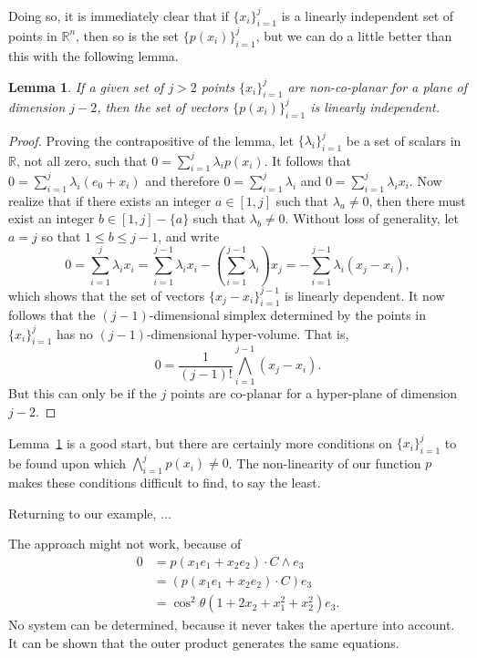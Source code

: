 \documentclass{birkjour}
\newtheorem{lem}[thm]{Lemma}
\theoremstyle{definition}
\theoremstyle{remark}
\numberwithin{equation}{section}
\newcommand{\R}{\mathbb{R}}
\begin{document}
Doing so, it is immediately clear that if $\{x_i\}_{i=1}^j$ is a linearly independent
set of points in $\R^n$, then so is the set $\{p(x_i)\}_{i=1}^j$, but we can do
a little better than this with the following lemma.
\begin{lem}\label{lma_non_co_planar}
If a given set of $j>2$ points $\{x_i\}_{i=1}^j$ are non-co-planar for a plane of
dimension $j-2$, then the set of vectors $\{p(x_i)\}_{i=1}^j$ is linearly independent.
\end{lem}
\begin{proof}
Proving the contrapositive of the lemma, let $\{\lambda_i\}_{i=1}^j$ be
a set of scalars in $\R$, not all zero, such that $0=\sum_{i=1}^j\lambda_i p(x_i)$.
It follows that $0=\sum_{i=1}^j\lambda_i(e_0+x_i)$ and therefore
$0=\sum_{i=1}^j\lambda_i$ and $0=\sum_{i=1}^j\lambda_i x_i$.
Now realize that if there exists an integer $a\in[1,j]$ such that $\lambda_a\neq 0$,
then there must exist an integer $b\in[1,j]-\{a\}$ such that $\lambda_b\neq 0$.
Without loss of generality, let $a=j$ so that $1\leq b\leq j-1$, and write
\begin{equation*}
0 = \sum_{i=1}^j\lambda_ix_i = \sum_{i=1}^{j-1}\lambda_ix_i - \left(\sum_{i=1}^{j-1}\lambda_i\right)x_j = -\sum_{i=1}^{j-1}\lambda_i(x_j-x_i),
\end{equation*}
which shows that the set of vectors $\{x_j-x_i\}_{i=1}^{j-1}$ is linearly dependent.
It now follows that the $(j-1)$-dimensional simplex determined by the points in $\{x_i\}_{i=1}^j$
has no $(j-1)$-dimensional hyper-volume.  That is,
\begin{equation*}
0 = \frac{1}{(j-1)!}\bigwedge_{i=1}^{j-1}(x_j-x_i).
\end{equation*}
But this can only be if the $j$ points are co-planar for a hyper-plane of dimension $j-2$.
\end{proof}

Lemma~\ref{lma_non_co_planar} is a good start, but there are certainly more conditions on $\{x_i\}_{i=1}^j$ to be found upon which
$\bigwedge_{i=1}^j p(x_i)\neq 0$.  The non-linearity of our function $p$ makes these conditions difficult to find, to say the least.

Returning to our example, ...


The approach might not work, because of
\begin{align*}
0 &= p(x_1e_1+x_2e_2)\cdot C\wedge e_3 \\
 &= (p(x_1e_1+x_2e_2)\cdot C)e_3 \\
 &= \cos^2\theta(1+2x_2+x_1^2+x_2^2)e_3.
\end{align*}
No system can be determined, because it never takes the aperture into account.
It can be shown that the outer product generates the same equations.
\end{document}
